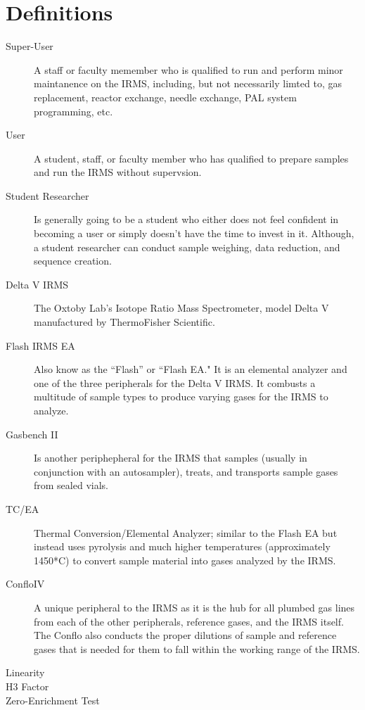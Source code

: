\documentclass[12pt]{../SOP3_beta}\usepackage[]{graphicx}\usepackage[]{color}
\begin{document}
\newpage

\section{Definitions}

\begin{description}

\item[Super-User] \label{Super-User} A staff or faculty memember who is qualified to run and perform minor maintanence on the IRMS, including, but not necessarily limted to, gas replacement, reactor exchange, needle exchange, PAL system programming, etc.  

\item[User] A student, staff, or faculty member who has qualified to prepare samples and run the IRMS without supervsion.

\item[Student Researcher] Is generally going to be a student who either does not feel confident in becoming a user or simply doesn't have the time to invest in it. Although, a student researcher can conduct sample weighing, data reduction, and sequence creation.

\item[Delta V IRMS] \label{IRMS} The Oxtoby Lab's Isotope Ratio Mass Spectrometer, model Delta V manufactured by ThermoFisher Scientific. 

\item[Flash IRMS EA] Also know as the ``Flash'' or ``Flash EA." It is an elemental analyzer and one of the three peripherals for the Delta V IRMS. It combusts a multitude of sample types to produce varying gases for the IRMS to analyze. 

\item[Gasbench II] Is another periphepheral for the IRMS that samples (usually in conjunction with an autosampler), treats, and transports sample gases from sealed vials.

\item[TC/EA] Thermal Conversion/Elemental Analyzer; similar to the Flash EA but instead uses pyrolysis and much higher temperatures (approximately 1450*C) to convert sample material into gases analyzed by the IRMS.

\item[ConfloIV] A unique peripheral to the IRMS as it is the hub for all plumbed gas lines from each of the other peripherals, reference gases, and the IRMS itself. The Conflo also conducts the proper dilutions of sample and reference gases that is needed for them to fall within the working range of the IRMS.

\item[Linearity]

\item[H3 Factor]

\item[Zero-Enrichment Test]

\end{description}
\end{document}
